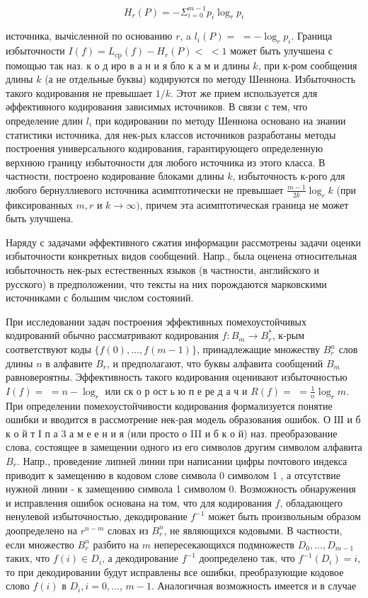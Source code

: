 \documentclass[10pt]{article}
\begin{document}
\[

H_{r}(P)=-\Sigma_{i=0}^{m-1} p_{i} \log _{r} p_{i}

\]



источника, вычісленной по основанию $r$, a $l_{i}(P)=$ $=-\log _{r} p_{i}$. Граница избыточности $I(f)=L_{\mathrm{cp}}(f)-H_{r}(P)<$ $<1$ может быть улучшена с помощью так наз. к о д иро в а н и я бло к а м и длины $k$, при к-ром сообщения длины $k$ (а не отдельные буквы) кодируются по методу Шеннона. Избыточность такого кодирования не превышает $1 / k$. Этот же прием используется для әффективного кодирования зависимых источников. В связи с тем, что определение длин $l_{i}$ при кодировании по методу Шеннона основано на знании статистики источника, для нек-рых классов источников разработаны методы построения универсального кодирования, гарантирующего определенную верхнюю границу избыточности для любого источника из этого класса. В частности, построено кодирование блоками длины $k$, избыточность к-рого для любого бернуллиевого источника асимптотически не превышает $\frac{m-1}{2 k} \log _{r} k$ (при фиксированных $m, r$ и $k \rightarrow \infty)$, причем эта асимптотическая граница не может быть улучшена.



Наряду с задачами әффективного сжатия информации рассмотрены задачи оценки избыточности конкретных видов сообщений. Напр., была оценена относительная избыточность нек-рых естественных языков (в частности, английского и русского) в предположении, что тексты на них порождаются марковскими источниками с большим числом состояний.



При исследовании задач построения эффективных помехоустойчивых кодирований обычно рассматривают кодирования $f: B_{m} \rightarrow B_{r}^{*}$, к-рым соответствуют коды $\{f(0), \ldots, f(m-1)\}$, принадлежащие множеству $B_{r}^{n}$ слов длины $n$ в алфавите $B_{r}$, и предполагают, что буквы алфавита сообщений $B_{m}$ равновероятны. Эффективность такого кодирования оценивают избыточностью $I(f)=$ $=n-\log _{r}$ или ск о р ост ь ю п е ре д а ч и $R(f)=$ $=\frac{1}{n} \log _{r} m$. При определении помехоустойчивости кодирования формализуется понятие ошибки и вводится в рассмотрение нек-рая модель образования ошибок. О ІІІ и б к о й т І п а 3 а м е е н и я (или просто о III и б к о й) наз. преобразование слова, состоящее в замещении одного из его символов другим символом алфавита $B_{r}$. Напр., проведение липней линии при написании цифры почтового индекса приводит к замещению в кодовом слове символа 0 символом 1 , а отсутствие нужной линии - к замещению символа 1 символом 0. Возможность обнаружения и исправления ошибок основана на том, что для кодирования $f$, обладающего ненулевой избыточностью, декодирование $f^{-1}$ может быть произвольным образом доопределено на $r^{n-m}$ словах из $B_{r}^{n}$, не являющихся кодовыми. В частности, если множество $B_{r}^{n}$ разбито на $m$ непересекающихся подмножеств $D_{0}, \ldots, D_{m-1}$ таких, что $f(i) \in D_{i}$, а декодирование $f^{-1}$ доопределено так, что $f^{-1}\left(D_{i}\right)=i$, то при декодировании будут исправлены все ошибки, преобразующие кодовое слово $f(i)$ в $D_{i}, i=0, \ldots$, $m-1$. Аналогичная возможность имеется и в случае
\end{document}
